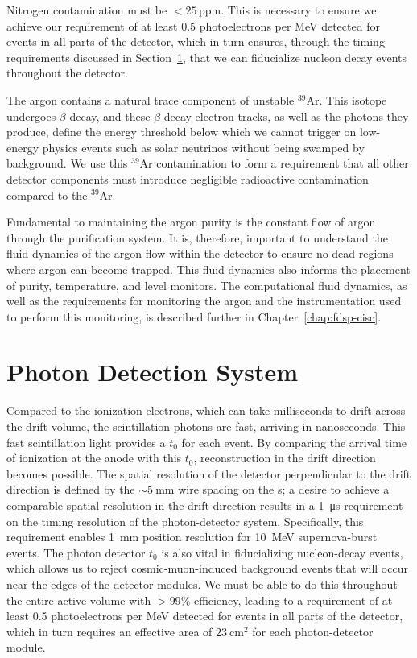 Nitrogen contamination must be $<\!25$\,ppm. This is necessary to ensure we achieve our requirement of at least 0.5 photoelectrons per MeV detected for events in all parts of the detector, which in turn ensures, through the timing requirements discussed in Section~\ref{sec:fdsp-exec-pds}, that we can fiducialize nucleon decay events throughout the detector.

The argon contains a natural trace component of unstable $^{39}$Ar. This isotope undergoes $\beta$ decay, and these $\beta$-decay electron tracks, as well as the photons they produce, define the energy threshold below which we cannot trigger on low-energy physics events such as solar neutrinos without
being swamped by background. We use this $^{39}$Ar contamination to form a requirement that all other detector components must introduce negligible radioactive contamination compared to the $^{39}$Ar.

Fundamental to maintaining the argon purity is the constant flow of argon through the purification system. It is, therefore, important to understand the fluid dynamics of the argon flow within the detector to ensure no dead regions where argon can become trapped. This fluid dynamics also informs the placement of purity, temperature, and level monitors. The computational fluid dynamics, as well as the requirements for monitoring the argon and the instrumentation used to perform this monitoring, is described further in Chapter~\ref{chap:fdsp-cisc}. 


\section{Photon Detection System}
\label{sec:fdsp-exec-pds}

Compared to the ionization electrons, which can take milliseconds to drift across the drift volume, the scintillation photons are fast, arriving in nanoseconds. This fast scintillation light provides a $t_{0}$ for each event. By comparing the arrival time of ionization at the anode with this $t_{0}$, reconstruction in the drift direction becomes possible. The spatial resolution of the detector perpendicular to the drift direction is defined by the $\sim\!\SI{5}{\mm}$ wire spacing on the s; a desire to achieve a comparable spatial resolution in the drift direction results in a \SI{1}{\micro\second} requirement on the timing resolution of the photon-detector system. Specifically, this requirement enables \SI{1}{\mm} position resolution for \SI{10}{\mega\electronvolt} supernova-burst events. The photon detector $t_{0}$ is also vital in fiducializing nucleon-decay events, which allows us to reject cosmic-muon-induced background events that will occur near the edges of the detector modules. We must be able to do this throughout the entire active volume with $>\!99\%$ efficiency, leading to a requirement of at least 0.5 photoelectrons per MeV detected for events in all parts of the detector, which in turn requires an effective area of $\SI{23}{\cm^{2}}$ for each photon-detector module.


